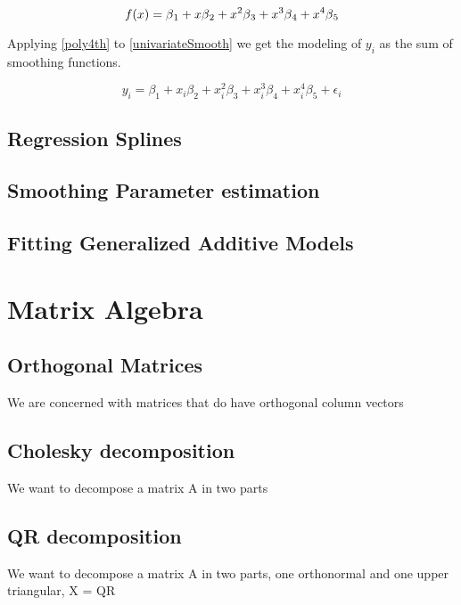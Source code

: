\documentclass{article}
\begin{document}
    \begin{equation} \label{poly4th} f(x) = \beta \textsubscript{1} + x\beta \textsubscript{2} + x^2\beta \textsubscript{3} + x^3\beta \textsubscript{4} + x^4\beta \textsubscript{5}  \end{equation}

    Applying \ref{poly4th} to \ref{univariateSmooth} we get the modeling of $y_i$ as the sum of smoothing functions.

    \begin{equation} \label{poly4thGAM}  y_i = \beta_1 + x_i\beta_2 + x_i^2\beta_3+ x_i^3\beta_4 + x_i^4\beta_5 + \epsilon_i \end{equation}
    \subsection{Regression Splines}
    \subsection{Smoothing Parameter estimation}
    \subsection{Fitting Generalized Additive Models}

    \section{Matrix Algebra}
    \subsection{Orthogonal Matrices}
    We are concerned with matrices that do have orthogonal column vectors
    \subsection{Cholesky decomposition}
    We want to decompose a matrix A in two parts
    \subsection{QR decomposition}
    We want to decompose a matrix A in two parts, one orthonormal and one upper triangular, X = QR


    \newpage


    \newpage
\end{document}
